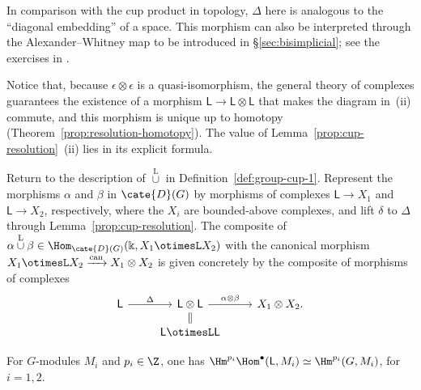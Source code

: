 In comparison with the cup product in topology, $\Delta$ here is analogous
to the ``diagonal embedding'' of a space. This morphism can also be
interpreted through the Alexander--Whitney map to be introduced in
\S\ref{sec:bisimplicial}; see the exercises in .

Notice that, because $\epsilon\otimes\epsilon$ is a quasi-isomorphism, the
general theory of complexes guarantees the existence of a morphism
$\mathsf{L}\to\mathsf{L}\otimes\mathsf{L}$ that makes the diagram in~(ii)
commute, and this morphism is unique up to homotopy
(Theorem~\ref{prop:resolution-homotopy}). The value of
Lemma~\ref{prop:cup-resolution}~(ii) lies in its explicit formula.

Return to the description of $\overset{\mathrm{L}}{\cup}$ in
Definition~\ref{def:group-cup-1}. Represent the morphisms $\alpha$ and
$\beta$ in $\cate{D}(G)$ by morphisms of complexes
$\mathsf{L}\to X_1$ and $\mathsf{L}\to X_2$, respectively, where the $X_i$
are bounded-above complexes, and lift $\delta$ to $\Delta$ through
Lemma~\ref{prop:cup-resolution}. The composite of
$\alpha\overset{\mathrm{L}}{\cup}\beta
\in\Hom_{\cate{D}(G)}(\Bbbk,X_1\otimesL X_2)$ with the canonical morphism
$X_1\otimesL X_2\xrightarrow{\text{can}}X_1\otimes X_2$ is given concretely
by the composite of morphisms of complexes
\[\begin{tikzcd}[row sep=small]
	\mathsf{L} \arrow[r, "\Delta"] & \mathsf{L} \otimes \mathsf{L} \arrow[r, "{\alpha \otimes \beta}"] & X_1 \otimes X_2. \\
	& \mathsf{L} \otimesL \mathsf{L} \arrow[equal, u] &
\end{tikzcd}\]

For $G$-modules $M_i$ and $p_i\in\Z$, one has
$\Hm^{p_i}\Hom^\bullet(\mathsf{L},M_i)\simeq\Hm^{p_i}(G,M_i)$, for
$i=1,2$.

